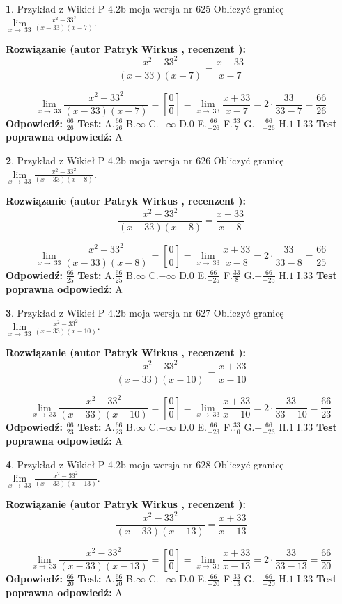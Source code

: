 \documentclass[12pt, a4paper]{article}
\theoremstyle{definition} %
\newtheorem{zad}{}
\newcommand{\zadStart}[1]{\begin{zad}#1\newline}
\newcommand{\zadStop}{\end{zad}}
\newcommand{\rozwStart}[2]{\noindent \textbf{Rozwiązanie (autor #1 , recenzent #2): }\newline}
\newcommand{\rozwStop}{\newline}
\newcommand{\odpStart}{\noindent \textbf{Odpowiedź:}\newline}
\newcommand{\odpStop}{\newline}
\newcommand{\testStart}{\noindent \textbf{Test:}\newline}
\newcommand{\testStop}{\newline}
\newcommand{\kluczStart}{\noindent \textbf{Test poprawna odpowiedź:}\newline}
\newcommand{\kluczStop}{\newline}
\begin{document}
\zadStart{Przykład z Wikieł P 4.2b moja wersja nr 625}
Obliczyć granicę $\lim\limits_{x\to\ 33}\frac{x^{2}-33^{2}}{(x-33)(x-7)}$.
\zadStop
\rozwStart{Patryk Wirkus}{}
$$\frac{x^{2}-33^{2}}{(x-33)(x-7)}=\frac{x+33}{x-7}$$

$$\lim\limits_{x\to\ 33}\frac{x^{2}-33^{2}}{(x-33)(x-7)}=[\frac{0}{0}]=\lim\limits_{x\to\ 33}\frac{x+33}{x-7}=2 \cdot \frac{33}{33-7} = \frac{66}{26}$$
\rozwStop
\odpStart
$\frac{66}{26}$
\odpStop
\testStart
A.$\frac{66}{26}$
B.$\infty$
C.$-\infty$
D.$0$
E.$\frac{66}{-26}$
F.$\frac{33}{7}$
G.$-\frac{66}{-26}$
H.$1$
I.$33$
\testStop
\kluczStart
A
\kluczStop



\zadStart{Przykład z Wikieł P 4.2b moja wersja nr 626}
Obliczyć granicę $\lim\limits_{x\to\ 33}\frac{x^{2}-33^{2}}{(x-33)(x-8)}$.
\zadStop
\rozwStart{Patryk Wirkus}{}
$$\frac{x^{2}-33^{2}}{(x-33)(x-8)}=\frac{x+33}{x-8}$$

$$\lim\limits_{x\to\ 33}\frac{x^{2}-33^{2}}{(x-33)(x-8)}=[\frac{0}{0}]=\lim\limits_{x\to\ 33}\frac{x+33}{x-8}=2 \cdot \frac{33}{33-8} = \frac{66}{25}$$
\rozwStop
\odpStart
$\frac{66}{25}$
\odpStop
\testStart
A.$\frac{66}{25}$
B.$\infty$
C.$-\infty$
D.$0$
E.$\frac{66}{-25}$
F.$\frac{33}{8}$
G.$-\frac{66}{-25}$
H.$1$
I.$33$
\testStop
\kluczStart
A
\kluczStop



\zadStart{Przykład z Wikieł P 4.2b moja wersja nr 627}
Obliczyć granicę $\lim\limits_{x\to\ 33}\frac{x^{2}-33^{2}}{(x-33)(x-10)}$.
\zadStop
\rozwStart{Patryk Wirkus}{}
$$\frac{x^{2}-33^{2}}{(x-33)(x-10)}=\frac{x+33}{x-10}$$

$$\lim\limits_{x\to\ 33}\frac{x^{2}-33^{2}}{(x-33)(x-10)}=[\frac{0}{0}]=\lim\limits_{x\to\ 33}\frac{x+33}{x-10}=2 \cdot \frac{33}{33-10} = \frac{66}{23}$$
\rozwStop
\odpStart
$\frac{66}{23}$
\odpStop
\testStart
A.$\frac{66}{23}$
B.$\infty$
C.$-\infty$
D.$0$
E.$\frac{66}{-23}$
F.$\frac{33}{10}$
G.$-\frac{66}{-23}$
H.$1$
I.$33$
\testStop
\kluczStart
A
\kluczStop



\zadStart{Przykład z Wikieł P 4.2b moja wersja nr 628}
Obliczyć granicę $\lim\limits_{x\to\ 33}\frac{x^{2}-33^{2}}{(x-33)(x-13)}$.
\zadStop
\rozwStart{Patryk Wirkus}{}
$$\frac{x^{2}-33^{2}}{(x-33)(x-13)}=\frac{x+33}{x-13}$$

$$\lim\limits_{x\to\ 33}\frac{x^{2}-33^{2}}{(x-33)(x-13)}=[\frac{0}{0}]=\lim\limits_{x\to\ 33}\frac{x+33}{x-13}=2 \cdot \frac{33}{33-13} = \frac{66}{20}$$
\rozwStop
\odpStart
$\frac{66}{20}$
\odpStop
\testStart
A.$\frac{66}{20}$
B.$\infty$
C.$-\infty$
D.$0$
E.$\frac{66}{-20}$
F.$\frac{33}{13}$
G.$-\frac{66}{-20}$
H.$1$
I.$33$
\testStop
\kluczStart
A
\kluczStop
\end{document}
